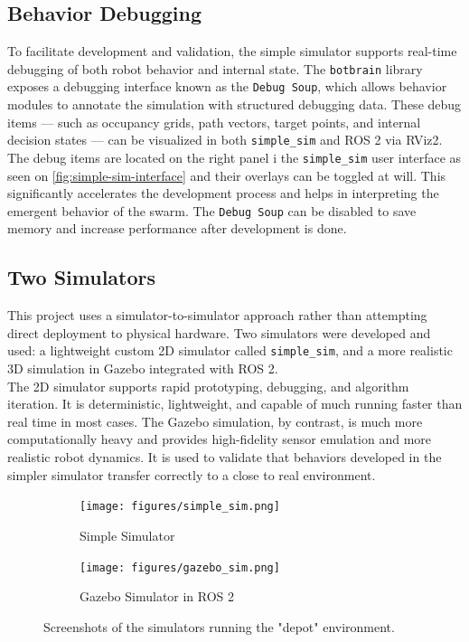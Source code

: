 \subsection{Behavior Debugging}
To facilitate development and validation, the simple simulator supports real-time debugging of both robot behavior and internal state. The \texttt{botbrain} library exposes a debugging interface known as the \texttt{Debug Soup}, which allows behavior modules to annotate the simulation with structured debugging data. These debug items --- such as occupancy grids, path vectors, target points, and internal decision states --- can be visualized in both \texttt{simple\_sim} and ROS 2 via RViz2. The debug items are located on the right panel i the \texttt{simple\_sim} user interface as seen on \cref{fig:simple-sim-interface} and their overlays can be toggled at will. This significantly accelerates the development process and helps in interpreting the emergent behavior of the swarm. The \texttt{Debug Soup} can be disabled to save memory and increase performance after development is done.

\subsection{Two Simulators}
This project uses a simulator-to-simulator approach rather than attempting direct deployment to physical hardware. Two simulators were developed and used: a lightweight custom 2D simulator called \texttt{simple\_sim}, and a more realistic 3D simulation in Gazebo integrated with ROS 2. \\

The 2D simulator supports rapid prototyping, debugging, and algorithm iteration. It is deterministic, lightweight, and capable of much running faster than real time in most cases. The Gazebo simulation, by contrast, is much more computationally heavy and provides high-fidelity sensor emulation and more realistic robot dynamics. It is used to validate that behaviors developed in the simpler simulator transfer correctly to a close to real environment. \\


\begin{figure}[h]
    \centering
    \begin{subfigure}[b]{0.45\textwidth}
        \centering
        \texttt{[image: figures/simple\_sim.png]}
        \caption{Simple Simulator}
    \end{subfigure}
    \hfill
    \begin{subfigure}[b]{0.45\textwidth}
        \centering
        \texttt{[image: figures/gazebo\_sim.png]}
        \caption{Gazebo Simulator in ROS 2}
    \end{subfigure}
    \caption{Screenshots of the simulators running the "depot" environment.}
    \label{fig:simulators}
\end{figure}

